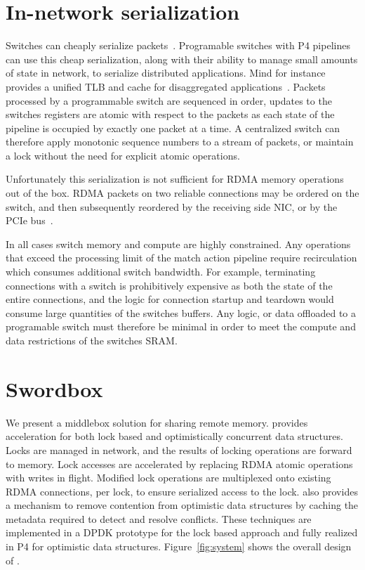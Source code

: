 \section{In-network serialization}

Switches can cheaply serialize packets~\cite{when-computer}.
Programable switches with P4 pipelines can use this cheap
serialization, along with their ability to manage small
amounts of state in network, to serialize distributed
applications. Mind for instance provides a unified TLB and
cache for disaggregated applications~\cite{mind}. Packets
processed by a programmable switch are sequenced in order,
updates to the switches registers are atomic with respect to
the packets as each state of the pipeline is occupied by
exactly one packet at a time. A centralized switch can
therefore apply monotonic sequence numbers to a stream of
packets, or maintain a lock without the need for explicit
atomic operations.

Unfortunately this serialization is not sufficient for RDMA
memory operations out of the box. RDMA packets on two
reliable connections may be ordered on the switch, and then
subsequently reordered by the receiving side NIC, or by the
PCIe bus~\cite{understanding-pcie}.

In all cases switch memory and compute are highly
constrained. Any operations that exceed the processing
limit of the match action pipeline require recirculation
which consumes additional switch bandwidth. For example,
terminating connections with a switch is prohibitively
expensive as both the state of the entire connections, and
the logic for connection startup and teardown would consume
large quantities of the switches buffers. Any logic, or data
offloaded to a programable switch must therefore be minimal
in order to meet the compute and data restrictions of the
switches SRAM.

\section{Swordbox}

We present {\sword} a middlebox solution for sharing remote
memory. {\sword} provides acceleration for both lock based and
optimistically concurrent data structures. Locks are managed
in network, and the results of locking operations are
forward to memory. Lock accesses are accelerated by
replacing RDMA atomic operations with writes in flight.
Modified lock operations are multiplexed onto existing RDMA
connections, per lock, to ensure serialized access to the
lock. {\sword} also provides a mechanism to remove contention
from optimistic data structures by caching the metadata
required to detect and resolve conflicts. These techniques
are implemented in a DPDK prototype for the lock based
approach and fully realized in P4 for optimistic data
structures. Figure~\ref{fig:system} shows the overall design
of {\sword}.

